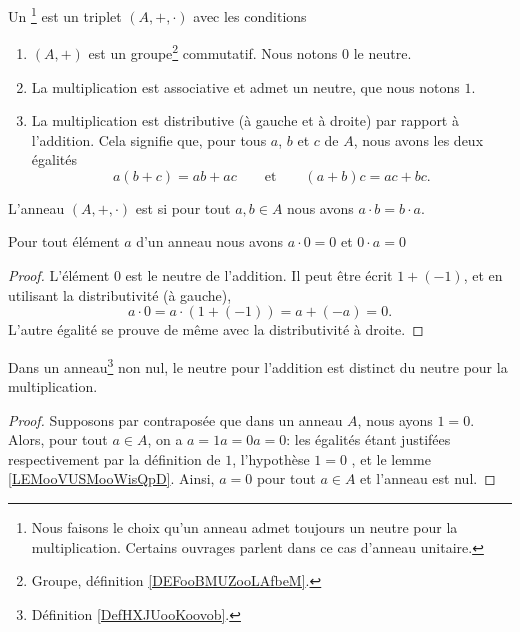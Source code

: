 \begin{definition}     \label{DefHXJUooKoovob}
	Un \footnote{Nous faisons le choix qu'un anneau admet toujours un neutre pour la multiplication. Certains ouvrages parlent dans ce cas d'anneau unitaire.} est un triplet \( (A,+,\cdot)\) avec les conditions
	\begin{enumerate}
		\item
		      \( (A,+)\) est un groupe\footnote{Groupe, définition \ref{DEFooBMUZooLAfbeM}.} commutatif. Nous notons \( 0\) le neutre.
		\item
		      La multiplication est associative et admet un neutre, que nous notons \( 1\).
		\item       \label{ITEMooGMNOooSTGiXw}
		      La multiplication est distributive (à gauche et à droite) par rapport à l'addition. Cela signifie que, pour tous \( a \), \( b \) et \( c \) de \( A \), nous avons les deux égalités
		      \begin{equation}
			      a(b+c) = ab + ac \qquad\text{et}\qquad (a+b)c = ac + bc.
		      \end{equation}
	\end{enumerate}
	L'anneau \( (A,+,\cdot)\) est  si pour tout \( a,b\in A\) nous avons \( a\cdot b=b\cdot a\).
\end{definition}

\begin{lemma}       \label{LEMooVUSMooWisQpD}
	Pour tout élément \( a\) d'un anneau nous avons \( a\cdot 0=0\) et \( 0\cdot a = 0\)
\end{lemma}

\begin{proof}
	L'élément \( 0\) est le neutre de l'addition. Il peut être écrit \( 1+(-1)\), et en utilisant la distributivité (à gauche),
	\begin{equation}
		a\cdot 0=a\cdot (1+(-1))=a+(-a)=0.
	\end{equation}
	L'autre égalité se prouve de même avec la distributivité à droite.
\end{proof}

\begin{proposition}     \label{PROPooNCCGooXjVyVt}
	Dans un anneau\footnote{Définition \ref{DefHXJUooKoovob}.} non nul, le neutre pour l'addition est distinct du neutre pour la multiplication.
\end{proposition}
\begin{proof}
	Supposons par contraposée que dans un anneau \( A\), nous ayons \( 1 = 0 \). Alors, pour tout \( a \in A \), on a \( a = 1a = 0a = 0 \): les égalités étant justifées respectivement par la définition de \( 1 \), l'hypothèse \( 1 = 0 \) , et le lemme \ref{LEMooVUSMooWisQpD}. Ainsi, \( a = 0\) pour tout \( a\in A\) et l'anneau est nul.
\end{proof}

